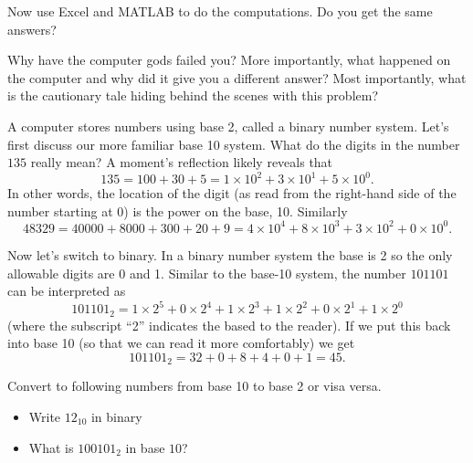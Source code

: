 \begin{problem}\label{prob:base_10_failb}
Now use Excel and MATLAB to do the computations.  Do you get the same answers?  
\end{problem}

\begin{problem}\label{prob:base_10_failc}
Why have the computer gods failed you?   More importantly, what happened on the computer and why did it give you a different answer?  Most importantly, what is the cautionary tale hiding behind the scenes with this problem?
\end{problem}

A computer stores numbers using base 2, called a binary number system.  Let's first
discuss our more familiar base 10 system.  What do the digits in the number $135$ really
mean?  A moment's reflection likely reveals that 
\[ 135 = 100 + 30 + 5 =  1 \times 10^2 + 3 \times 10^1 + 5 \times 10^0. \]
In other words, the location of the digit (as read from the right-hand side of the number
starting at 0) is the power on the base, 10.  Similarly
\[ 48329 = 40000 + 8000 + 300 + 20 + 9 = 4 \times 10^4 + 8 \times 10^3 + 3 \times 10^2 + 0
\times 10^0. \]

Now let's switch to binary.  In a binary number system the base is 2 so the only allowable
digits are 0 and 1.  Similar to the base-10 system, the number $101101$ can be interpreted
as
\[ 101101_2 = 1 \times 2^5 + 0 \times 2^4 + 1 \times 2^3 + 1 \times 2^2 + 0 \times 2^1 + 1
\times 2^0 \]
(where the subscript ``2'' indicates the based to the reader).
If we put this back into base 10 (so that we can read it more comfortably) we get
\[ 101101_2 = 32 + 0 + 8 + 4 + 0 + 1 = 45. \] 

\begin{problem}
Convert to following numbers from base 10 to base 2 or visa versa.
    \begin{itemize}
        \item Write $12_{10}$ in binary \solution{
                \[ 12_{10} = 8+4 = 1\cdot 2^3 + 1 \cdot 2^2 + 0 \cdot 2^1 + 0 \cdot 2^0 = 1100_2\]
            }

        \item What is $100101_2$ in base $10$? \solution{
                \[ 100101_2 = 1 \cdot 2^0 + 0 \cdot 2^1 + 1 \cdot 2^2 + 0 \cdot 2^3 + 0 \cdot 2^4 + 1 \cdot 2^5 = 1 + 4 + 32 = 37 \]
            }
    \end{itemize}
\end{problem}

